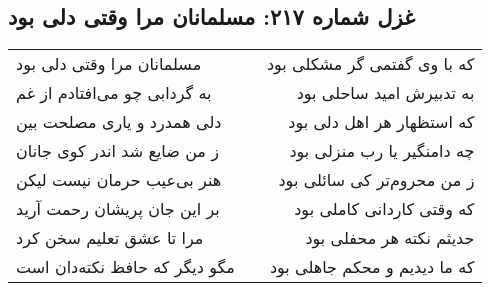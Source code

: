\begin{center}
\section*{غزل شماره ۲۱۷: مسلمانان مرا وقتی دلی بود}
\label{sec:sh217}
\begin{longtable}{l p{0.5cm} r}
مسلمانان مرا وقتی دلی بود
&&
که با وی گفتمی گر مشکلی بود
\\
به گردابی چو می‌افتادم از غم
&&
به تدبیرش امید ساحلی بود
\\
دلی همدرد و یاری مصلحت بین
&&
که استظهار هر اهل دلی بود
\\
ز من ضایع شد اندر کوی جانان
&&
چه دامنگیر یا رب منزلی بود
\\
هنر بی‌عیب حرمان نیست لیکن
&&
ز من محروم‌تر کی سائلی بود
\\
بر این جان پریشان رحمت آرید
&&
که وقتی کاردانی کاملی بود
\\
مرا تا عشق تعلیم سخن کرد
&&
حدیثم نکته هر محفلی بود
\\
مگو دیگر که حافظ نکته‌دان است
&&
که ما دیدیم و محکم جاهلی بود
\\
\end{longtable}
\end{center}
